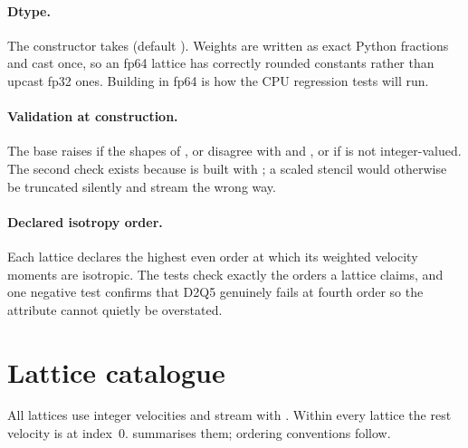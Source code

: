 \paragraph{Dtype.}
The constructor takes  (default ). Weights are written as
exact Python fractions and cast once, so an fp64 lattice has correctly rounded constants
rather than upcast fp32 ones. Building in fp64 is how the CPU regression tests will run.

\paragraph{Validation at construction.}
The base raises  if the shapes of ,  or  disagree
with  and , or if  is not integer-valued. The second check exists
because  is built with ; a scaled stencil would otherwise be
truncated silently and stream the wrong way.

\paragraph{Declared isotropy order.}
Each lattice declares the highest even order at which its weighted velocity moments are
isotropic. The tests check exactly the orders a lattice claims, and one negative test
confirms that D2Q5 genuinely fails at fourth order so the attribute cannot quietly be
overstated.


\section{Lattice catalogue}

All lattices use integer velocities and stream with . Within every lattice
the rest velocity is at index~0.  summarises them; ordering conventions
follow.

